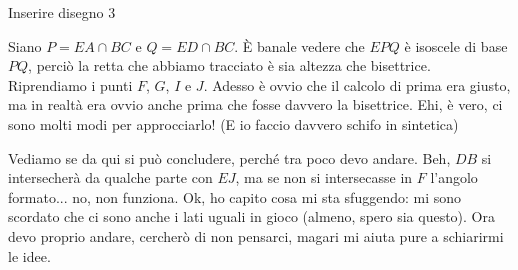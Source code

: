\begin{sol}
  Inserire disegno 3

  Siano $P=EA \cap BC$ e $Q=ED \cap BC$. È banale vedere che $EPQ$ è isoscele di base $PQ$, perciò la retta che abbiamo tracciato è sia altezza che bisettrice. Riprendiamo i punti $F$, $G$, $I$ e $J$. Adesso è ovvio che il calcolo di prima era giusto, ma in realtà era ovvio anche prima che fosse davvero la bisettrice. Ehi, è vero, ci sono molti modi per approcciarlo! (E io faccio davvero schifo in sintetica)

  Vediamo se da qui si può concludere, perché tra poco devo andare. Beh, $DB$ si intersecherà da qualche parte con $EJ$, ma se non si intersecasse in $F$ l'angolo formato... no, non funziona. Ok, ho capito cosa mi sta sfuggendo: mi sono scordato che ci sono anche i lati uguali in gioco (almeno, spero sia questo). Ora devo proprio andare, cercherò di non pensarci, magari mi aiuta pure a schiarirmi le idee.
\end{sol}
